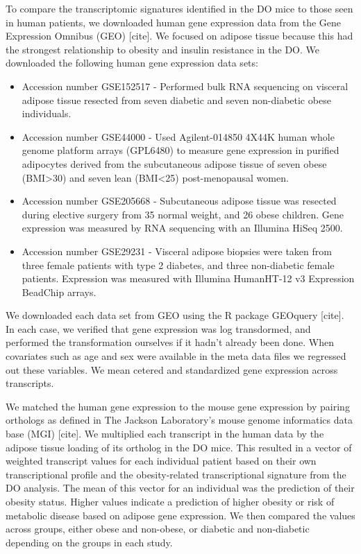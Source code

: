 \documentclass[
]{article}
\begin{document}
To compare the transcriptomic signatures identified in the DO mice to
those seen in human patients, we downloaded human gene expression data
from the Gene Expression Omnibus (GEO) {[}cite{]}. We focused on adipose
tissue because this had the strongest relationship to obesity and
insulin resistance in the DO. We downloaded the following human gene
expression data sets:

\begin{itemize}
\item
  Accession number GSE152517 - Performed bulk RNA sequencing on visceral
  adipose tissue resected from seven diabetic and seven non-diabetic
  obese individuals.
\item
  Accession number GSE44000 - Used Agilent-014850 4X44K human whole
  genome platform arrays (GPL6480) to measure gene expression in
  purified adipocytes derived from the subcutaneous adipose tissue of
  seven obese (BMI\textgreater30) and seven lean (BMI\textless25)
  post-menopausal women.
\item
  Accession number GSE205668 - Subcutaneous adipose tissue was resected
  during elective surgery from 35 normal weight, and 26 obese children.
  Gene expression was measured by RNA sequencing with an Illumina HiSeq
  2500.
\item
  Accession number GSE29231 - Visceral adipose biopsies were taken from
  three female patients with type 2 diabetes, and three non-diabetic
  female patients. Expression was measured with Illumina HumanHT-12 v3
  Expression BeadChip arrays.
\end{itemize}

We downloaded each data set from GEO using the R package GEOquery
{[}cite{]}. In each case, we verified that gene expression was log
transdormed, and performed the transformation ourselves if it hadn't
already been done. When covariates such as age and sex were available in
the meta data files we regressed out these variables. We mean cetered
and standardized gene expression across transcripts.

We matched the human gene expression to the mouse gene expression by
pairing orthologs as defined in The Jackson Laboratory's mouse genome
informatics data base (MGI) {[}cite{]}. We multiplied each transcript in
the human data by the adipose tissue loading of its ortholog in the DO
mice. This resulted in a vector of weighted transcript values for each
individual patient based on their own transcriptional profile and the
obesity-related transcriptional signature from the DO analysis. The mean
of this vector for an individual was the prediction of their obesity
status. Higher values indicate a prediction of higher obesity or risk of
metabolic disease based on adipose gene expression. We then compared the
values across groups, either obese and non-obese, or diabetic and
non-diabetic depending on the groups in each study.
\end{document}
